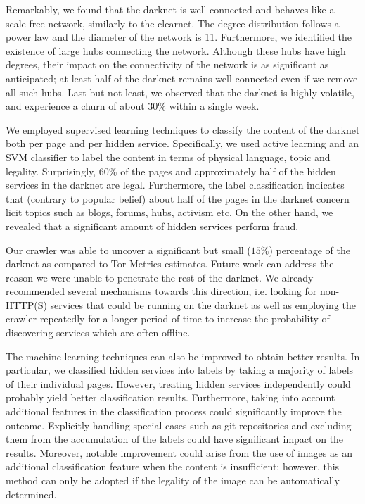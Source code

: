 \documentclass[USenglish,oneside,twocolumn]{article}
\newcommand{\sh}[1]{\noindent\vspace{0.5\baselineskip}\\ \textbf{#1}\\}
\begin{document}
Remarkably, we found that the darknet is well connected and behaves like a scale-free network, similarly to the clearnet. The degree distribution follows a power law and the diameter of the network is 11. Furthermore, we identified the existence of large hubs connecting the network. Although these hubs have  high degrees, their impact on the connectivity of the network is as significant as anticipated; at least half of the darknet remains well connected even if we remove all such hubs. Last but not least, we observed that the darknet is highly volatile, and experience a churn of about $30\%$ within a single week.

We employed supervised learning techniques to classify the content of the darknet both per page and per hidden service. Specifically, we used active learning and an SVM classifier to label the content in terms of physical language, topic and legality. 
Surprisingly, 60\% of the pages and approximately half of the hidden services in the darknet are legal. Furthermore, the label classification indicates that (contrary to popular belief) about half of the pages in the darknet concern licit topics such as blogs, forums, hubs, activism etc. On the other hand, we revealed that a significant amount of hidden services perform fraud. 

Our crawler was able to uncover a significant but small ($15\%$) percentage of the darknet as compared to Tor Metrics estimates. Future work can address the reason we were unable to penetrate the rest of the darknet. We already recommended several mechanisms towards this direction, i.e. looking for non-HTTP(S) services that could be running on the darknet as well as employing the crawler repeatedly for a longer period of time to increase the probability of discovering services which are often offline.


The machine learning techniques can also be improved to obtain better results. In particular, we classified hidden services into labels by taking a majority of labels of their individual pages. However, treating hidden services independently could probably yield better classification results.  
Furthermore, taking into account additional features in the classification process could significantly improve the outcome. Explicitly handling special cases such as git repositories and excluding them from the accumulation of the labels could have significant impact on the results. Moreover, notable improvement could arise from the use of images as an additional classification feature when the content is insufficient; however, this method can only be adopted if the legality of the image can be automatically determined.
\end{document}
